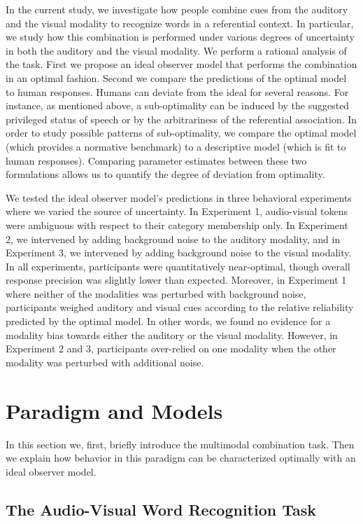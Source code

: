 \documentclass[english,floatsintext,man]{apa6}
\theoremstyle{definition}
\theoremstyle{definition}
\theoremstyle{definition}
\theoremstyle{remark}
\begin{document}
In the current study, we investigate how people combine cues from the
auditory and the visual modality to recognize words in a referential
context. In particular, we study how this combination is performed under
various degrees of uncertainty in both the auditory and the visual
modality. We perform a rational analysis of the task. First we propose
an ideal observer model that performs the combination in an optimal
fashion. Second we compare the predictions of the optimal model to human
responses. Humans can deviate from the ideal for several reasons. For
instance, as mentioned above, a sub-optimality can be induced by the
suggested privileged status of speech or by the arbitrariness of the
referential association. In order to study possible patterns of
sub-optimality, we compare the optimal model (which provides a normative
benchmark) to a descriptive model (which is fit to human responses).
Comparing parameter estimates between these two formulations allows us
to quantify the degree of deviation from optimality.

We tested the ideal observer model's predictions in three behavioral
experiments where we varied the source of uncertainty. In Experiment 1,
audio-visual tokens were ambiguous with respect to their category
membership only. In Experiment 2, we intervened by adding background
noise to the auditory modality, and in Experiment 3, we intervened by
adding background noise to the visual modality. In all experiments,
participants were quantitatively near-optimal, though overall response
precision was slightly lower than expected. Moreover, in Experiment 1
where neither of the modalities was perturbed with background noise,
participants weighed auditory and visual cues according to the relative
reliability predicted by the optimal model. In other words, we found no
evidence for a modality bias towards either the auditory or the visual
modality. However, in Experiment 2 and 3, participants over-relied on
one modality when the other modality was perturbed with additional
noise.

\section{Paradigm and Models}\label{paradigm-and-models}

In this section we, first, briefly introduce the multimodal combination
task. Then we explain how behavior in this paradigm can be characterized
optimally with an ideal observer model.

\subsection{The Audio-Visual Word Recognition
Task}\label{the-audio-visual-word-recognition-task}
\end{document}
